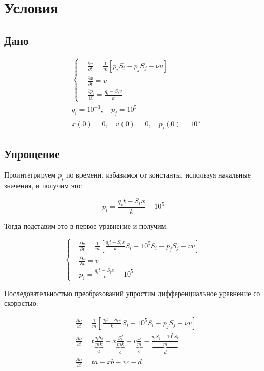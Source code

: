 \documentclass[12pt, a4paper]{article}
\begin{document}
\section{Условия}

\subsection{Дано}

$$\begin{aligned}
&\left\{\begin{aligned}
	&\frac{\partial v}{\partial t} = \frac{1}{m}\left[p_i S_i-p_jS_j-\nu v\right]\\
	&\frac{\partial x}{\partial t} = v \\
	&\frac{\partial p_i}{\partial t} = \frac{q_i - S_i v}{k}
	\end{aligned}\right. \\
&q_i = 10^{-3}, \quad p_j = 10^5 \\
&x(0) = 0, \quad v(0) = 0, \quad p_i(0) = 10^5
\end{aligned}$$

\subsection{Упрощение}

Проинтегрируем $p_i$ по времени, избавимся от константы, используя начальные значения, и получим это:

$$ p_i = \frac{q_i t - S_i x}{k} + 10^5 $$

Тогда подставим это в первое уравнение и получим:

$$\left\{\begin{aligned}
&\frac{\partial v}{\partial t} = \frac{1}{m}\left[\frac{q_it-S_ix}{k}S_i + 10^5 S_i -p_jS_j-\nu v\right]\\
&\frac{\partial x}{\partial t} = v \\
&p_i = \frac{q_i t - S_i x}{k} + 10^5
\end{aligned}\right.$$

Последовательностью преобразований упростим дифференциальное уравнение со скоростью:

$$\begin{aligned}
&\frac{\partial v}{\partial t} = \frac{1}{m}\left[\frac{q_it-S_ix}{k}S_i + 10^5 S_i -p_jS_j-\nu v\right] \\
&\frac{\partial v}{\partial t} = t\underbrace{\frac{q_i S_i}{m k}}_a - x\underbrace{\frac{S_i^2}{m k}}_b - v\underbrace{\frac{\nu}{m}}_c - \underbrace{\frac{p_j S_j-10^5 S_i}{m}}_d \\
&\frac{\partial v}{\partial t} = t a - x b - v c - d
\end{aligned}$$
\end{document}
